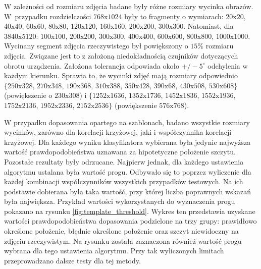 W zależności od rozmiaru zdjęcia badane były różne rozmiary wycinka obrazów. W~przypadku rozdzielczości $768\textrm{x}1024$ były to fragmenty o wymiarach: $20\textrm{x}20$, $40\textrm{x}40$, $60\textrm{x}60$, $80\textrm{x}80$, $120\textrm{x}120$, $160\textrm{x}160$, $200\textrm{x}200$, $300\textrm{x}300$. Natomiast, dla $3840\textrm{x}5120$: $100\textrm{x}100$, $200\textrm{x}200$, $300\textrm{x}300$, $400\textrm{x}400$, $600\textrm{x}600$, $800\textrm{x}800$, $1000\textrm{x}1000$. Wycinany segment zdjęcia rzeczywistego był powiększony o $15\%$ rozmiaru zdjęcia. Związane jest to z założoną niedokładnością czujników dotyczących obrotu urządzenia. Założona tolerancja odpowiada około $+/-5^\circ$ odchylenia w każdym kierunku. Sprawia to, że wycinki zdjęć mają rozmiary odpowiednio $\{250\textrm{x}328$, $270\textrm{x}348$, $190\textrm{x}368$, $310\textrm{x}388$, $350\textrm{x}428$, $390\textrm{x}68$, $430\textrm{x}508$, $530\textrm{x}608\}$ (powiększenie o $230\textrm{x}308$) i $\{1252\textrm{x}1636$, $1352\textrm{x}1736$, $1452\textrm{x}1836$, $1552\textrm{x}1936$, $1752\textrm{x}2136$, $1952\textrm{x}2336$, $2152\textrm{x}2536\}$ (powiększenie $576\textrm{x}768$).

W przypadku dopasowania opartego na szablonach, badano wszystkie rozmiary wycinków, zarówno dla korelacji krzyżowej, jaki i współczynnika korelacji krzyżowej. Dla każdego wyniku klasyfikatora wybierana była jedynie najwyższa wartość prawdopodobieństwa uznawana za hipotetyczne położenie szczytu. Pozostałe rezultaty były odrzucane. Najpierw jednak, dla każdego ustawienia algorytmu ustalana była wartość progu. Odbywało się to poprzez wyliczenie dla każdej kombinacji współczynników wszystkich przypadków testowych. Na ich podstawie dobierana była taka wartość, przy której liczba poprawnych wskazań była największa. Przykład wartości wykorzystanych do wyznaczenia progu pokazano na rysunku \ref{fig:template_threshold}. Wykres ten przedstawia uzyskane wartości prawdopodobieństwa dopasowania podzielone na trzy grupy: prawidłowo określone położenie, błędnie określone położenie oraz szczyt niewidoczny na zdjęciu rzeczywistym. Na rysunku została zaznaczona również wartość progu wybrana dla tego ustawienia algorytmu. Przy tak wyliczonych limitach przeprowadzano dalsze testy dla tej metody. 

